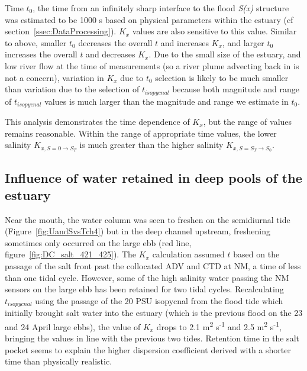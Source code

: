 Time $t_0$, the time from an infinitely sharp interface to the flood \emph{S(x)} structure was estimated to be 1000 s based on physical parameters within the estuary (cf section~\ref{ssec:DataProcessing}). $K_x$ values are also sensitive to this value. Similar to above, smaller $t_0$ decreases the overall $t$ and increases $K_x$, and larger $t_0$ increases the overall $t$ and decreases $K_x$. Due to the small size of the estuary, and low river flow at the time of measurements (so a river plume advecting back in is not a concern), variation in $K_x$ due to $t_0$ selection is likely to be much smaller than variation due to the selection of $t_{isopycnal}$ because both magnitude and range of $t_{isopycnal}$ values is much larger than the magnitude and range we estimate in  $t_0$.

This analysis demonstrates the time dependence of $K_x$, but the range of values remains reasonable. Within the range of appropriate time values, the lower salinity $K_{x,S=0\rightarrow S_T}$ is much greater than the higher salinity $K_{x,S=S_T\rightarrow S_0}$. 

\subsection{Influence of water retained in deep pools of the estuary}
Near the mouth, the water column was seen to freshen on the semidiurnal tide (Figure~\ref{fig:UandSvsTch4}) but in the deep channel upstream, freshening sometimes only occurred on the large ebb (red line, figure~\ref{fig:DC_salt_421_425}). The $K_x$ calculation assumed $t$ based on the passage of the salt front past the collocated ADV and CTD at NM, a time of less than one tidal cycle. However, some of the high salinity water passing the NM sensors on the large ebb has been retained for two tidal cycles. Recalculating $t_{isopycnal}$ using the passage of the 20 PSU isopycnal from the flood tide which initially brought salt water into the estuary (which is the previous flood on the 23 and 24 April large ebbs), the value of $K_x$ drops to 2.1 m\textsuperscript{2} s\textsuperscript{-1} and 2.5 m\textsuperscript{2} s\textsuperscript{-1}, bringing the values in line with the previous two tides. Retention time in the salt pocket seems to explain the higher dispersion coefficient derived with a shorter time than physically realistic.


